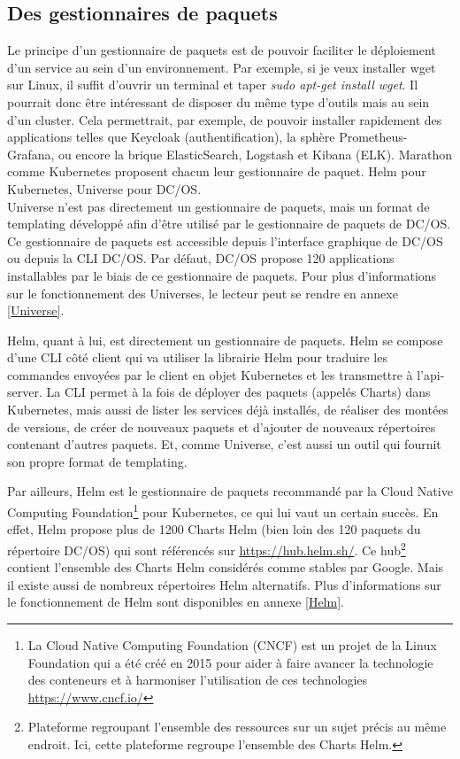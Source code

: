 \documentclass[11pt,fleqn]{book} %
\begin{document}
\subsection{Des gestionnaires de paquets}
Le principe d'un gestionnaire de paquets est de pouvoir faciliter le déploiement d'un service au sein d'un environnement. Par exemple, si je veux installer wget sur Linux, il suffit d'ouvrir un terminal et taper \textit{sudo apt-get install wget}. Il pourrait donc être intéressant de disposer du même type d'outils mais au sein d'un cluster. Cela permettrait, par exemple, de pouvoir installer rapidement des applications telles que Keycloak (authentification), la sphère Prometheus-Grafana, ou encore la brique ElasticSearch, Logstash et Kibana (ELK). Marathon comme Kubernetes proposent chacun leur gestionnaire de paquet. Helm pour Kubernetes, Universe pour DC/OS. \\

Universe n'est pas directement un gestionnaire de paquets, mais un format de templating développé afin d'être utilisé par le gestionnaire de paquets de DC/OS. Ce gestionnaire de paquets est accessible depuis l'interface graphique de DC/OS ou depuis la CLI DC/OS. Par défaut, DC/OS propose 120 applications installables par le biais de ce gestionnaire de paquets. Pour plus d'informations sur le fonctionnement des Universes, le lecteur peut se rendre en annexe \ref{Universe}. \newline 

Helm, quant à lui, est directement un gestionnaire de paquets. Helm se compose d'une CLI côté client qui va utiliser la librairie Helm pour traduire les commandes envoyées par le client en objet Kubernetes et les transmettre à l'api-server. La CLI permet à la fois de déployer des paquets (appelés Charts) dans Kubernetes, mais aussi de lister les services déjà installés, de réaliser des montées de versions, de créer de nouveaux paquets et d'ajouter de nouveaux répertoires contenant d'autres paquets. Et, comme Universe, c'est aussi un outil qui fournit son propre format de templating.\newline

Par ailleurs, Helm est le gestionnaire de paquets recommandé par la Cloud Native Computing Foundation\footnote{La Cloud Native Computing Foundation (CNCF) est un projet de la Linux Foundation qui a été créé en 2015 pour aider à faire avancer la technologie des conteneurs et à harmoniser l'utilisation de ces technologies \url{https://www.cncf.io/}} pour Kubernetes, ce qui lui vaut un certain succès. En effet, Helm propose plus de 1200 Charts Helm (bien loin des 120 paquets du répertoire DC/OS) qui sont référencés sur \url{https://hub.helm.sh/}. Ce hub\footnote{Plateforme regroupant l'ensemble des ressources sur un sujet précis au même endroit. Ici, cette plateforme regroupe l'ensemble des Charts Helm.} contient l'ensemble des Charts Helm considérés comme stables par Google. Mais il existe aussi de nombreux répertoires Helm alternatifs. Plus d'informations sur le fonctionnement de Helm sont disponibles en annexe \ref{Helm}.\newline
\end{document}
